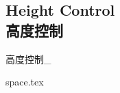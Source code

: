 \setcounter{section}{4}
\setcounter{subsection}{9}
\setcounter{subsubsection}{0}
\subsection{Height Control\\高度控制}\label{sec:heightcontrol}

% 
% 
% 
% 
% 
% 
% 
% 
% 









高度控制_

space.tex








